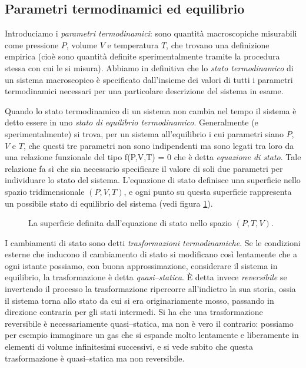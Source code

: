 \subsection{Parametri termodinamici ed equilibrio}
\label{sec1:par}

Introduciamo i {\em parametri termodinamici}: sono quantità macroscopiche misurabili come pressione $P$, volume $V$ e temperatura $T$, che trovano una definizione empirica (cioè sono quantità definite sperimentalmente tramite la procedura stessa con cui le si misura). Abbiamo in definitiva che lo {\em stato termodinamico} di un sistema macroscopico è specificato dall'insieme dei valori di tutti i parametri termodinamici necessari per una particolare descrizione del sistema in esame.

Quando lo stato termodinamico di un sistema non cambia nel tempo il sistema è detto essere in uno {\em stato di equilibrio termodinamico}. Generalmente (e sperimentalmente) si trova, per un sistema all'equilibrio i cui parametri siano $P$, $V$ e $T$, che questi tre parametri non sono indipendenti ma sono legati tra loro da una relazione funzionale del tipo
\be
\label{eq:stato_termo}
f(P,V,T) = 0
\ee
che è detta {\em equazione di stato}. Tale relazione fa sì che sia necessario specificare il valore di soli due parametri per individuare lo stato del sistema. L'equazione di stato definisce una superficie nello spazio tridimensionale $(P,V,T)$, e ogni punto su questa superficie rappresenta un possibile stato di equilibrio del sistema (vedi figura \ref{fig:eq-stato}).

\begin{figure}[!ht]
  \centering
  
  \caption{La superficie definita dall'equazione di stato nello spazio $(P,T,V)$.}
  \label{fig:eq-stato}
\end{figure}

I cambiamenti di stato sono detti {\em trasformazioni termodinamiche}. Se le condizioni esterne che inducono il cambiamento di stato si modificano così lentamente che a ogni istante possiamo, con buona approssimazione, considerare il sistema in equilibrio, la trasformazione è detta {\em quasi--statica}. \`E detta invece {\em reversibile} se invertendo il  processo la trasformazione ripercorre all'indietro la sua storia, ossia il sistema torna allo stato da cui si era originariamente mosso, passando in direzione contraria per gli stati intermedi. Si ha che una trasformazione reversibile è necessariamente quasi--statica, ma non è vero il contrario: possiamo per esempio immaginare un gas che si espande molto lentamente e liberamente in elementi di volume infinitesimi successivi, e si vede subito che questa trasformazione è quasi--statica ma non reversibile.

